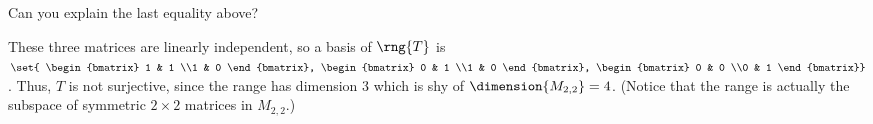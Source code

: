 %
Can you explain the last equality above?\par
%
These three matrices are linearly independent, so a basis of $\rng{T}$ is 
$\set{
\begin{bmatrix} 1 & 1 \\1 & 0 \end{bmatrix}, 
\begin{bmatrix} 0 & 1 \\1 & 0 \end{bmatrix}, 
\begin{bmatrix} 0 & 0 \\0 & 1 \end{bmatrix}}$.  Thus, $T$ is not surjective, since the range has dimension 3 which is shy of $\dimension{M_{2,2}}=4$.
(Notice that the range is actually the subspace of symmetric $2 \times 2$ matrices in $M_{2,2}$.)